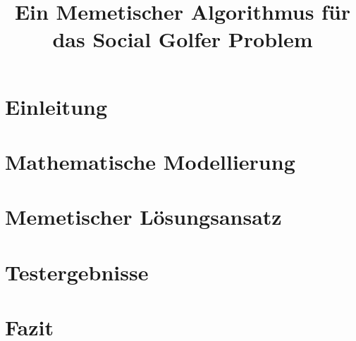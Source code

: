 \documentclass[draft]{tcs-seminar}
\begin{document}
\title{Ein Memetischer Algorithmus für das Social Golfer Problem}

\begin{abstract}

\end{abstract}

\maketitle


\section{Einleitung}
  


\section{Mathematische Modellierung}
    


\section{Memetischer Lösungsansatz}
  

\section{Testergebnisse}
  


\section{Fazit}
  

\begin{thebibliography}{9}  
    
\end{thebibliography}
\end{document}
